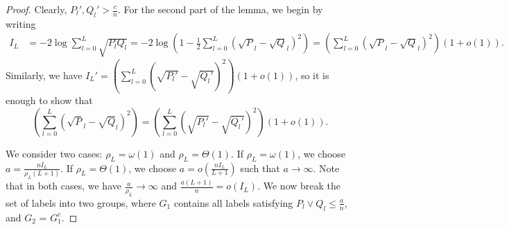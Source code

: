 \documentclass{article}
\begin{document}
\begin{proof}
Clearly, $P_l', Q_l' > \frac{c}{n}$. For the second part of the lemma, we begin by writing
\begin{align*}
I_L &= -2\log \sum_{l=0}^L \sqrt{P_lQ_l} = -2\log\left(1 - \frac{1}{2}\sum_{l=0}^L (\sqrt P_l - \sqrt Q_l)^2\right) =\left( \sum_{l=0}^L (\sqrt P_l - \sqrt Q_l)^2\right) (1+o(1)).
\end{align*}
Similarly, we have $I_L' = \left( \sum_{l=0}^L (\sqrt {P_l'} - \sqrt {Q_l'})^2\right) (1+o(1))$, so it is enough to show that 
$$\left( \sum_{l=0}^L (\sqrt P_l - \sqrt Q_l)^2\right) = \left( \sum_{l=0}^L (\sqrt {P_l'} - \sqrt {Q_l'})^2\right) (1+o(1)).$$ 

We consider two cases: $\rho_L = \omega(1)$ and $\rho_L = \Theta(1)$. If $\rho_L = \omega(1)$, we choose $a = \frac{nI_L}{\rho_L(L+1)}$. If $\rho_L = \Theta(1)$, we choose $a = o\left(\frac{nI_L}{L+1}\right)$ such that $a \to \infty$. Note that in both cases, we have $\frac{a}{\rho_L} \to \infty$ and $\frac{a(L+1)}{n} = o(I_L)$. We now break the set of labels into two groups, where $G_1$ contains all labels satisfying $P_l \vee Q_l \leq \frac{a}{n}$, and $G_2$ = $G_1^c$. 


\end{proof}
\end{document}
